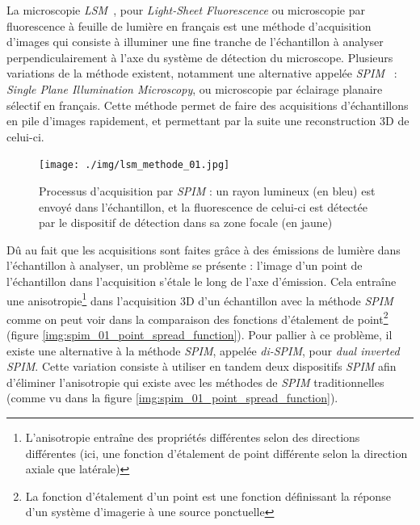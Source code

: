 {{		La microscopie \textit{LSM}~\cite{cite_lsfm_explication_girard}, pour \textit{Light-Sheet Fluorescence} ou microscopie par fluorescence à feuille de lumière en français est une méthode d'acquisition d'images qui consiste à illuminer une fine tranche de l'échantillon à analyser perpendiculairement à l'axe du système de détection du microscope. Plusieurs variations de la méthode existent, notamment une alternative appelée \textit{SPIM}~\cite{cite_spim_explication_original} : \textit{Single Plane Illumination Microscopy}, ou microscopie par éclairage planaire sélectif en français. Cette méthode permet de faire des acquisitions d'échantillons en pile d'images rapidement, et permettant par la suite une reconstruction 3D de celui-ci.\\
		\par

		\begin{figure}[H]
			\centering
			\texttt{[image: ./img/lsm\_methode\_01.jpg]}
			\caption{Processus d'acquisition par \textit{SPIM} : un rayon lumineux (en bleu) est envoyé dans l'échantillon, et la fluorescence de celui-ci est détectée par le dispositif de détection dans sa zone focale (en jaune)}
			\label{img:lsm_01_how_it_works}
		\end{figure}

		Dû au fait que les acquisitions sont faites grâce à des émissions de lumière dans l'échantillon à analyser, un problème se présente : l'image d'un point de l'échantillon dans l'acquisition s'étale le long de l'axe d'émission. Cela entraîne une anisotropie\footnote{L'anisotropie entraîne des propriétés différentes selon des directions différentes (ici, une fonction d'étalement de point différente selon la direction axiale que latérale)} dans l'acquisition 3D d'un échantillon avec la méthode \textit{SPIM} comme on peut voir dans la comparaison des fonctions d'étalement de point\footnote{La fonction d'étalement d'un point est une fonction définissant la réponse d'un système d'imagerie à une source ponctuelle\label{fn:psf}} (figure \ref{img:spim_01_point_spread_function}). Pour pallier à ce problème, il existe une alternative à la méthode \textit{SPIM}, appelée \textit{di-SPIM}, pour \textit{dual inverted SPIM}. Cette variation consiste à utiliser en tandem deux dispositifs \textit{SPIM} afin d'éliminer l'anisotropie qui existe avec les méthodes de \textit{SPIM} traditionnelles (comme vu dans la figure \ref{img:spim_01_point_spread_function}).\par

}}
